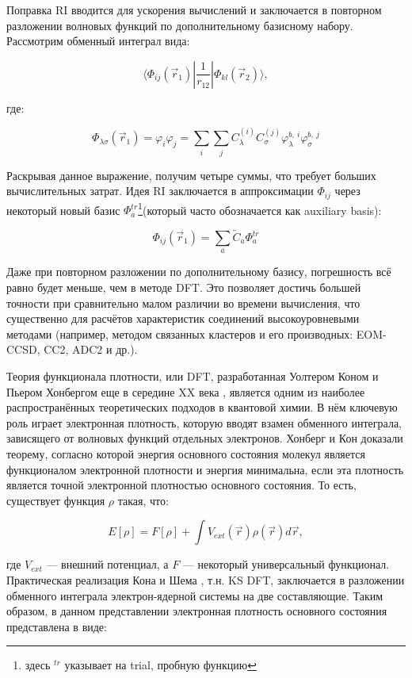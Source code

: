 \documentclass[a4paper,12pt]{article}
\begin{document}
\begin{onehalfspace}
	Поправка RI вводится для ускорения вычислений и заключается в повторном разложении волновых функций по дополнительному базисному набору. Рассмотрим обменный интеграл вида:
	
	$$
	\langle \Phi_{ij}(\vec r_1) | \frac1{r_{12}}| \Phi_{kl}(\vec r_2) \rangle,
	$$
	
	где: 
	
	$$
	\Phi_{\lambda \sigma}(\vec r_1) = \varphi_i \varphi_j = \sum_i \sum_j C_\lambda ^{(i)} C_\sigma ^{(j)} \varphi^{b,\ i}_\lambda \varphi^{b,\ j}_\sigma 
	$$
	
	Раскрывая данное выражение, получим четыре суммы, что требует больших вычислительных затрат. Идея RI заключается в аппроксимации $\Phi_{ij}$ через некоторый новый базис  $\Phi_a^{tr}$\footnote{здесь $^{tr}$ указывает на trial, пробную функцию}(который часто обозначается как auxiliary basis):
	
	$$
	\Phi_{ij}(\vec r_1) = \sum_{a}\widetilde{C}_a \Phi_a^{tr}
	$$
	
	Даже при повторном разложении по дополнительному базису, погрешность всё равно будет меньше, чем в методе DFT. Это позволяет достичь большей точности при сравнительно малом различии во времени вычисления, что существенно для расчётов характеристик соединений высокоуровневыми методами (например, методом связанных кластеров и его производных: EOM-CCSD, CC2, ADC2  и др.).
	
	Теория функционала плотности, или DFT, разработанная Уолтером Коном и Пьером Хонбергом еще в середине XX века \cite{HoenbergKohn1964}, является одним из наиболее распространённых теоретических подходов в квантовой химии. В нём ключевую роль играет электронная плотность, которую вводят взамен обменного интеграла, зависящего от волновых функций отдельных электронов. Хонберг и Кон доказали теорему, согласно которой энергия основного состояния молекул является функционалом электронной плотности и энергия минимальна, если эта плотность является точной электронной плотностью основного состояния. То есть, существует функция $\rho$ такая, что:
	
	\begin{equation}
		E[\rho] = F[\rho] + \int V_{ext}(\vec r)\rho (\vec r) d\vec r,
	\end{equation}
	
	где $V_{ext}$ — внешний потенциал, а $F$ — некоторый универсальный функционал. Практическая реализация Кона и Шема \cite{KohnSham1965}, т.н. KS DFT, заключается в разложении обменного интеграла электрон-ядерной системы на две составляющие. Таким образом, в данном представлении электронная плотность основного состояния представлена в виде:
	

\end{onehalfspace}
\end{document}
